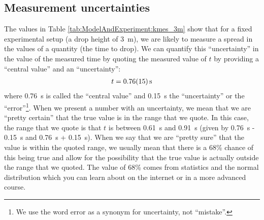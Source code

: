 \subsection{Measurement uncertainties}
The values in Table \ref{tab:ModelAndExperiment:kmes_3m} show that for a fixed experimental setup (a drop height of \SI{3}{m}), we are likely to measure a spread in the values of a quantity (the time to drop). We can quantify this ``uncertainty'' in the value of the measured time by quoting the measured value of $t$ by providing a ``central value'' and an ``uncertainty'':
\begin{align*}
t = \SI{0.76 \pm 0.15}{s}
\end{align*}
where \SI{0.76}{s} is called the ``central value'' and \SI{0.15}{s} the ``uncertainty'' or the ``error''\footnote{We use the word error as a synonym for uncertainty, not ``mistake''.}. When we present a number with an uncertainty, we mean that we are ``pretty certain'' that the true value is in the range that we quote. In this case, the range that we quote is that $t$ is between \SI{0.61}{s} and \SI{0.91}{s} (given by \SI{0.76}{s} - \SI{0.15}{s} and \SI{0.76}{s} + \SI{0.15}{s}). When we say that we are ``pretty sure'' that the value is within the quoted range, we usually mean that there is a 68\% chance of this being true and allow for the possibility that the true value is actually outside the range that we quoted. The value of 68\% comes from statistics and the normal distribution which you can learn about on the internet or in a more advanced course. 

